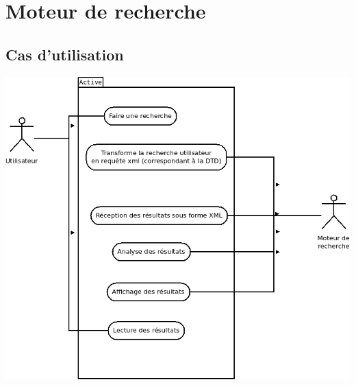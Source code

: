 \documentclass[a4paper,12pt]{report}
\begin{document}
\section{Moteur de recherche}

\subsection{Cas d'utilisation}\label{utilisation-recherche}
\begin{center}
\includegraphics[scale=0.5]{"images/cas_utilisation_recherche"}
\end{center}
\end{document}
